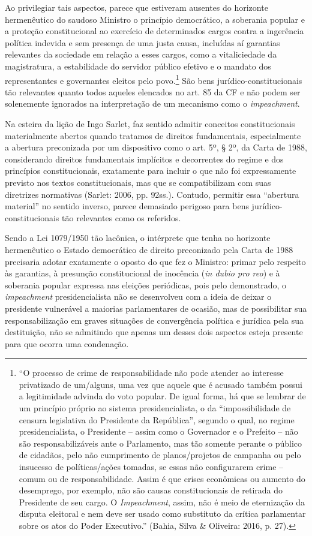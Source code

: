 Ao privilegiar tais aspectos, parece que estiveram ausentes do horizonte
hermenêutico do saudoso Ministro o princípio democrático, a soberania
popular e a proteção constitucional ao exercício de determinados cargos
contra a ingerência política indevida e sem presença de uma justa causa,
incluídas aí garantias relevantes da sociedade em relação a esses
cargos, como a vitaliciedade da magistratura, a estabilidade do servidor
público efetivo e o mandato dos representantes e governantes eleitos
pelo povo.\footnote{``O processo de crime de responsabilidade não pode
  atender ao interesse privatizado de um/alguns, uma vez que aquele que
  é acusado também possui a legitimidade advinda do voto popular. De
  igual forma, há que se lembrar de um princípio próprio ao sistema
  presidencialista, o da ``impossibilidade de censura legislativa do
  Presidente da República'', segundo o qual, no regime presidencialista,
  o Presidente -- assim como o Governador e o Prefeito -- não são
  responsabilizáveis ante o Parlamento, mas tão somente perante o
  público de cidadãos, pelo não cumprimento de planos/projetos de
  campanha ou pelo insucesso de políticas/ações tomadas, se essas não
  configurarem crime -- comum ou de responsabilidade. Assim é que crises
  econômicas ou aumento do desemprego, por exemplo, não são causas
  constitucionais de retirada do Presidente de seu cargo. O
  \emph{Impeachment}, assim, não é meio de eternização da disputa
  eleitoral e nem deve ser usado como substituto da crítica parlamentar
  sobre os atos do Poder Executivo.'' (Bahia, Silva \& Oliveira: 2016,
  p. 27).} São bens jurídico-constitucionais tão relevantes quanto todos
aqueles elencados no art. 85 da CF e não podem ser solenemente ignorados
na interpretação de um mecanismo como o \emph{impeachment}.

Na esteira da lição de Ingo Sarlet, faz sentido admitir conceitos
constitucionais materialmente abertos quando tratamos de direitos
fundamentais, especialmente a abertura preconizada por um dispositivo
como o art. 5º, § 2º, da Carta de 1988, considerando direitos
fundamentais implícitos e decorrentes do regime e dos princípios
constitucionais, exatamente para incluir o que não foi expressamente
previsto nos textos constitucionais, mas que se compatibilizam com suas
diretrizes normativas (Sarlet: 2006, pp. 92ss.). Contudo, permitir essa
``abertura material'' no sentido inverso, parece demasiado perigoso para
bens jurídico-constitucionais tão relevantes como os referidos.

Sendo a Lei 1079/1950 tão lacônica, o intérprete que tenha no horizonte
hermenêutico o Estado democrático de direito preconizado pela Carta de
1988 precisaria adotar exatamente o oposto do que fez o Ministro: primar
pelo respeito às garantias, à presunção constitucional de inocência
(\emph{in dubio pro reo}) e à soberania popular expressa nas eleições
periódicas, pois pelo demonstrado, o \emph{impeachment} presidencialista
não se desenvolveu com a ideia de deixar o presidente vulnerável a
maiorias parlamentares de ocasião, mas de possibilitar sua
responsabilização em graves situações de convergência política e
jurídica pela sua destituição, não se admitindo que apenas um desses
dois aspectos esteja presente para que ocorra uma condenação.

